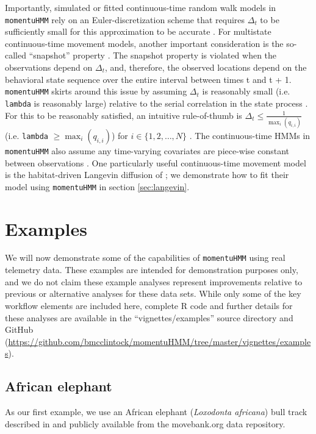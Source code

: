 \documentclass[12pt]{article}\usepackage[]{graphicx}\usepackage[]{xcolor}
\begin{document}
Importantly, simulated or fitted continuous-time random walk models in \verb|momentuHMM| rely on an Euler-discretization scheme that requires $\Delta_t$ to be sufficiently small for this approximation to be accurate \citep[e.g.][]{MichelotEtAl2019,McClintockLander2024}. For multistate continuous-time movement models, another important consideration is the so-called ``snapshot'' property \citep[e.g.][]{GlennieEtAl2021}. The snapshot property is violated when the observations depend on $\Delta_t$, and, therefore, the observed locations depend on the behavioral state sequence over the entire interval between times t and t + 1. \verb|momentuHMM| skirts around this issue by assuming $\Delta_t$ is reasonably small (i.e. \verb|lambda| is reasonably large) relative to the serial correlation in the state process \citep[e.g.][]{McClintockLander2024}. For this to be reasonably satisfied, an intuitive rule-of-thumb is $\Delta_t \le \frac{1}{\max_i\left(q_{i,i}\right)}$ (i.e. \verb|lambda| $\ge \max_i\left(q_{i,i}\right)$) for $i \in \{1,2,\ldots,N\}$ \citep[][]{GlennieEtAl2021}. The continuous-time HMMs in \verb|momentuHMM| also assume any time-varying covariates are piece-wise constant between observations \citep[e.g.][]{Jackson2011}. %
One particularly useful continuous-time movement model is the habitat-driven Langevin diffusion of \citet{MichelotEtAl2019}; we demonstrate how to fit their model using \verb|momentuHMM| in section \ref{sec:langevin}.
  
\section{Examples}
\label{sec:example}
We will now demonstrate some of the capabilities of \verb|momentuHMM| using real telemetry data. These examples are intended for demonstration purposes only, and we do not claim these example analyses represent improvements relative to previous or alternative analyses for these data sets. While only some of the key workflow elements are included here, complete R code and further details for these analyses are available in the ``vignettes/examples'' source directory and GitHub (\url{https://github.com/bmcclintock/momentuHMM/tree/master/vignettes/examples}).


\subsection{African elephant}
\label{sec:elephant}
As our first example, we use an African elephant ({\it Loxodonta africana}) bull track described in \cite{WallEtAl2014} and publicly available from the movebank.org data repository. 
\end{document}
